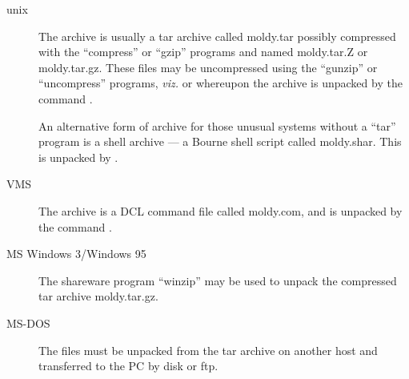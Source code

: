 \documentclass[a4paper,twoside]{report}
\newcommand{\Fname}[1]{{\upshape\mdseries\sffamily#1}}
\begin{document}
\begin{description}
\item[unix] The archive is usually a tar archive called
  \Fname{moldy.tar} possibly compressed with the ``compress'' or
  ``gzip'' programs and named \Fname{moldy.tar.Z} or
  \Fname{moldy.tar.gz}. These files may be uncompressed using the
  ``gunzip''  or ``uncompress'' programs, \emph{viz.}
   or  whereupon
  the archive is unpacked by the command .
  
  An alternative form of archive for those unusual systems without a
  ``tar'' program is a shell archive --- a Bourne shell script called
  \Fname{moldy.shar}. This is unpacked by .  

\item[VMS]  The archive is a DCL command file called \Fname{moldy.com},
and is unpacked by the command .

\item[MS Windows 3/Windows 95] The shareware program ``winzip'' may be
  used to unpack the compressed tar archive \Fname{moldy.tar.gz}.

\item[MS-DOS] The files must be unpacked from the tar archive on
another host and transferred to the PC by disk or ftp.

\end{description}


\end{document}

